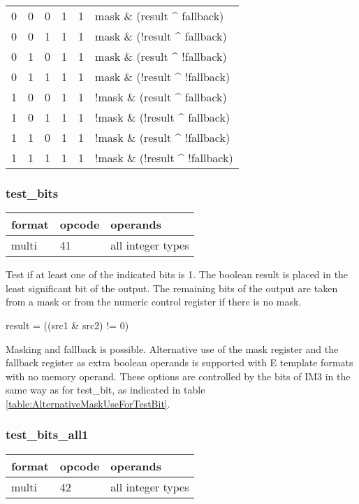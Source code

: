 \documentclass[forwardcom.tex]{subfiles}
\begin{document}
\begin{longtable} {|p{10mm}|p{10mm}|p{10mm}|p{10mm}|p{10mm}|p{60mm}|}
\hline
0 & 0 & 0 & 1 & 1 & mask \& (result \^{} fallback) \\
0 & 0 & 1 & 1 & 1 & mask \& (!result \^{} fallback) \\
0 & 1 & 0 & 1 & 1 & mask \& (result \^{} !fallback) \\
0 & 1 & 1 & 1 & 1 & mask \& (!result \^{} !fallback) \\
1 & 0 & 0 & 1 & 1 & !mask \& (result \^{} fallback) \\
1 & 0 & 1 & 1 & 1 & !mask \& (!result \^{} fallback) \\
1 & 1 & 0 & 1 & 1 & !mask \& (result \^{} !fallback) \\
1 & 1 & 1 & 1 & 1 & !mask \& (!result \^{} !fallback) \\
\hline
\end{longtable}
\vspace{2mm}


\subsubsection{test\_bits}
\label{table:testBitsInstruction}
\begin{tabular}{|p{12mm}|p{12mm}|p{110mm}|}
\hline
\bfseries format & \bfseries opcode & \bfseries operands \\ \hline
multi & 41 & all integer types \\ \hline
\end{tabular}
\vspace{2mm}

Test if at least one of the indicated bits is 1.
The boolean result is placed in the least significant bit of the output. The remaining bits of the output are taken from a mask or from the numeric control register if there is no mask.
\vspace{2mm}

result = ((src1 \& src2) != 0)

\vspace{2mm}
Masking and fallback is possible. Alternative use of the mask register and the fallback register as extra boolean operands is supported with E template formats with no memory operand. These options are controlled by the bits of IM3 in the same way as for test\_bit, as indicated in table \ref{table:AlternativeMaskUseForTestBit}.

\subsubsection{test\_bits\_all1}
\label{table:testBitsAll1Instruction}
\begin{tabular}{|p{12mm}|p{12mm}|p{110mm}|}
\hline
\bfseries format & \bfseries opcode & \bfseries operands \\ \hline
multi & 42 & all integer types \\ \hline
\end{tabular}
\vspace{2mm}
\end{document}
